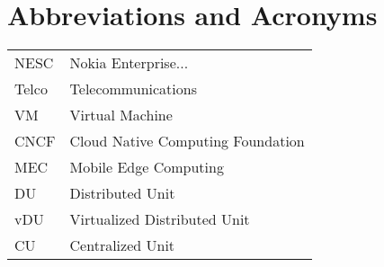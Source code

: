 \chapter*{Abbreviations and Acronyms}


\noindent
\begin{longtable}{@{}p{}p{}@{}}
NESC & Nokia Enterprise... \\
Telco & Telecommunications \\
VM & Virtual Machine \\
CNCF & Cloud Native Computing Foundation \\
MEC & Mobile Edge Computing \\
DU & Distributed Unit \\
vDU & Virtualized Distributed Unit \\
CU & Centralized Unit \\



\end{longtable}
